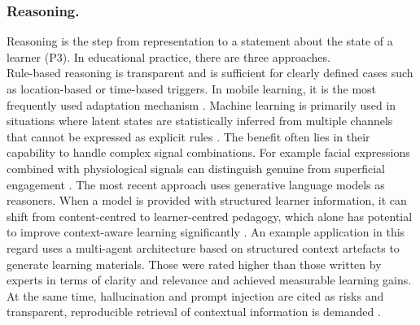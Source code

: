 \documentclass[runningheads]{llncs}
\begin{document}
\subsubsection{Reasoning.}
Reasoning is the step from representation to a statement about the state of a learner (P3). In educational practice, there are three approaches.\\
Rule-based reasoning is transparent and is sufficient for clearly defined cases such as
location-based or time-based triggers. In mobile learning, it is
the most frequently used adaptation mechanism \cite{hasanov_survey_2019}.
Machine learning is primarily used in situations where latent states
are statistically inferred from multiple channels that cannot be expressed as explicit
rules \cite{hong_advances_2025}.
The benefit often lies in their capability to handle complex signal combinations. For example facial expressions combined with physiological signals can distinguish genuine from superficial engagement \cite{hong_advances_2025}.
The most recent approach uses generative language models as reasoners. When a model
is provided with structured learner information, it can shift from content-centred to learner-centred pedagogy, which alone has potential to improve context-aware learning significantly \cite{hatchett_learning_2026}.
An example application in this regard uses a multi-agent architecture based on structured context artefacts to generate learning materials. Those were rated higher than those written by experts in terms of clarity and relevance and achieved measurable learning gains. At the same time, hallucination and prompt injection are cited as risks and transparent, reproducible retrieval of contextual information is demanded \cite{schuring_generating_2025}.
\end{document}

